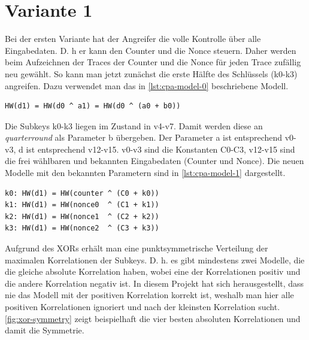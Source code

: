 \documentclass[a4paper,ngerman]{scrreprt}
\begin{document}
\section{Variante 1}

Bei der ersten Variante hat der Angreifer die volle Kontrolle über alle
Eingabedaten. D. h er kann den Counter und die Nonce steuern. Daher werden beim
Aufzeichnen der Traces der Counter und die Nonce für jeden Trace zufällig neu
gewählt. So kann man jetzt zunächst die erste Hälfte des Schlüssels (k0-k3)
angreifen. Dazu verwendet man das in \autoref{lst:cpa-model-0} beschriebene
Modell.

\begin{lstlisting}[caption={Modell für Stromverbrauch}, label=lst:cpa-model-0]
HW(d1) = HW(d0 ^ a1) = HW(d0 ^ (a0 + b0))
\end{lstlisting}

\medskip

Die Subkeys k0-k3 liegen im Zustand in v4-v7. Damit werden diese an
\emph{quarterround} als Parameter b übergeben. Der Parameter a ist entsprechend
v0-v3, d ist entsprechend v12-v15. v0-v3 sind die Konstanten C0-C3, v12-v15 sind
die frei wählbaren und bekannten Eingabedaten (Counter und Nonce). Die neuen
Modelle mit den bekannten Parametern sind in \autoref{lst:cpa-model-1}
dargestellt.

\begin{lstlisting}[caption={Modell für Stromverbrauch von d1}, label=lst:cpa-model-1]
k0: HW(d1) = HW(counter ^ (C0 + k0))
k1: HW(d1) = HW(nonce0  ^ (C1 + k1))
k2: HW(d1) = HW(nonce1  ^ (C2 + k2))
k3: HW(d1) = HW(nonce2  ^ (C3 + k3))
\end{lstlisting}

\medskip

Aufgrund des XORs erhält man eine punktsymmetrische Verteilung der maximalen
Korrelationen der Subkeys. D. h. es gibt mindestens zwei Modelle, die die
gleiche absolute Korrelation haben, wobei eine der Korrelationen positiv und die
andere Korrelation negativ ist. In diesem Projekt hat sich herausgestellt, dass
nie das Modell mit der positiven Korrelation korrekt ist, weshalb man hier alle
positiven Korrelationen ignoriert und nach der kleinsten Korrelation sucht.
\autoref{fig:xor-symmetry} zeigt beispielhaft die vier besten absoluten
Korrelationen und damit die Symmetrie.
\end{document}
